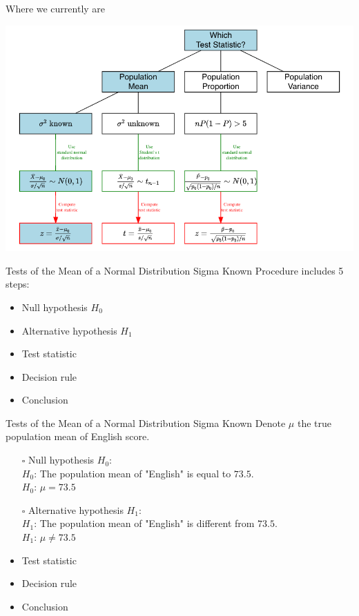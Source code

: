 \documentclass[
  10pt,
  ignorenonframetext,
]{beamer}
\providecommand{\tightlist}{%
  \setlength{\itemsep}{0pt}\setlength{\parskip}{0pt}}
\begin{document}
\begin{frame}{Where we currently are}
\protect\hypertarget{where-we-currently-are-3}{}
\begin{center}\includegraphics[width=0.9\linewidth]{pictures/HypothesisTestsGuide-Case1} \end{center}
\end{frame}

\begin{frame}{Tests of the Mean of a Normal Distribution Sigma Known}
\protect\hypertarget{tests-of-the-mean-of-a-normal-distribution-sigma-known}{}
Procedure includes 5 steps:

\begin{itemize}
\tightlist
\item
  Null hypothesis \(H_0\)
\item
  Alternative hypothesis \(H_1\)
\item
  Test statistic
\item
  Decision rule
\item
  Conclusion
\end{itemize}
\end{frame}

\begin{frame}{Tests of the Mean of a Normal Distribution Sigma Known}
\protect\hypertarget{tests-of-the-mean-of-a-normal-distribution-sigma-known-1}{}
Denote \(\mu\) the true population mean of English score.

\begin{itemize}
    \item [$\square$] Null hypothesis $H_0$:\\
      $H_0$: The population mean of "English" is equal to $73.5$.\\  
      $H_0$: $\mu = 73.5$
    \vspace{2mm}
    \item [$\square$] Alternative hypothesis $H_1$:\\
      $H_1$: The population mean of "English" is different from $73.5$.\\  
      $H_1$: $\mu \neq 73.5$
    \vspace{2mm}
    \item Test statistic
    \item Decision rule
    \item Conclusion
\end{itemize}
\end{frame}
\end{document}
